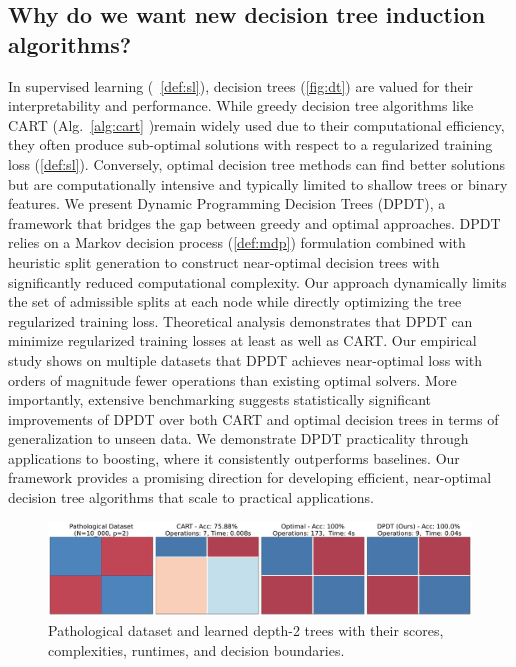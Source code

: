 \subsection{Why do we want new decision tree induction algorithms?}
In supervised learning (~\ref{def:sl}), decision trees (\ref{fig:dt}) are valued for their interpretability and performance. 
While greedy decision tree algorithms like CART (Alg.~\ref{alg:cart} \cite{breiman1984classif})remain widely used due to their computational efficiency, they often produce sub-optimal solutions with respect to a regularized training loss (\ref{def:sl}). 
Conversely, optimal decision tree methods can find better solutions but are computationally intensive and typically limited to shallow trees or binary features. We present Dynamic Programming Decision Trees (DPDT), a framework that bridges the gap between greedy and optimal approaches. 
DPDT relies on a Markov decision process (\ref{def:mdp}) formulation combined with heuristic split generation to construct near-optimal decision trees with significantly reduced computational complexity. 
Our approach dynamically limits the set of admissible splits at each node while directly optimizing the tree regularized training loss. Theoretical analysis demonstrates that DPDT can minimize regularized training losses at least as well as CART\@. 
Our empirical study shows on multiple datasets that DPDT achieves near-optimal loss with orders of magnitude fewer operations than existing optimal solvers. 
More importantly, extensive benchmarking suggests statistically significant improvements of DPDT over both CART and optimal decision trees in terms of generalization to unseen data. We demonstrate DPDT practicality through applications to boosting, where it consistently outperforms baselines. 
Our framework provides a promising direction for developing efficient, near-optimal decision tree algorithms that scale to practical applications.

\begin{figure}
    \includegraphics[width=\textwidth]{images/figures/patho_bounds_comparison_checkers.pdf}
    \caption{Pathological dataset and learned depth-2 trees with their scores, complexities, runtimes, and decision boundaries.}
    \label{fig:patho}
\end{figure}

